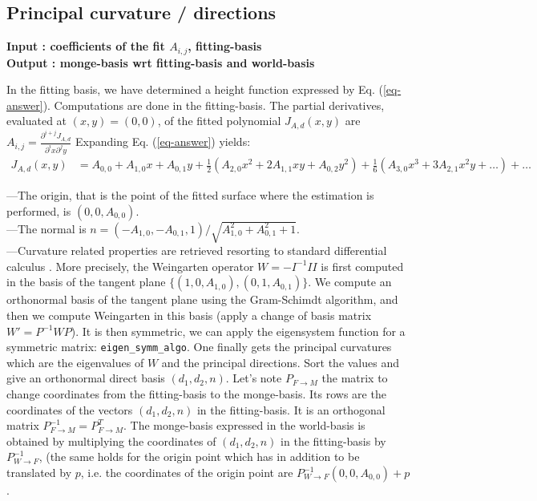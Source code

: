 \subsection{Principal  curvature / directions}

{\bf Input : coefficients of the fit $A_{i,j}$, 
fitting-basis \\
Output : monge-basis wrt fitting-basis and world-basis
}

In the fitting basis, we have determined a height function expressed
by Eq. (\ref{eq-answer}). Computations are done in the fitting-basis.
The partial derivatives, evaluated at $(x,y)=(0,0)$, of the fitted
polynomial $J_{A,d}(x,y)$ are
$A_{i,j}=\frac{\partial^{i+j}J_{A,d}}{\partial^ix \partial^jy}$
Expanding Eq. (\ref{eq-answer}) yields:
\begin{eqnarray}
J_{A,d}(x,y)&=
A_{0,0}+A_{1,0}x+A_{0,1}y+\frac{1}{2}(A_{2,0}x^2+2A_{1,1}xy+A_{0,2}y^2) 
+ \frac{1}{6}(A_{3,0}x^3+3A_{2,1}x^2y+\ldots )+ \ldots 
\end{eqnarray}


---The origin, that is the point of the fitted surface where the
estimation is performed, is $(0,0,A_{0,0})$. \\
---The normal is
$n=(-A_{1,0},-A_{0,1},1)/\sqrt{A_{1,0}^2+A_{0,1}^2+1}$.\\
---Curvature related properties are retrieved resorting to standard
differential calculus \cite{c-dgcs-76}. More precisely, the Weingarten
operator $W=-I^{-1}II$ is first computed in the basis of the tangent
plane $\{ (1,0,A_{1,0}), (0,1,A_{0,1}) \}$. We compute an orthonormal
basis of the tangent plane using the Gram-Schimdt algorithm, and then
we compute Weingarten in this basis (apply a change of basis matrix
$W'=P^{-1}WP$). It is then symmetric, we can apply the eigensystem
function for a symmetric matrix:
\verb+eigen_symm_algo+.
One finally gets the principal curvatures which are the eigenvalues of
$W$ and the principal directions. Sort the values and give an
orthonormal direct basis $(d_1,d_2,n)$. Let's note $P_{F
\rightarrow M}$ the matrix to change coordinates from the
fitting-basis to the monge-basis. Its rows are the coordinates of the
vectors $(d_1,d_2,n)$ in the fitting-basis. It is an orthogonal matrix
$P_{F \rightarrow M}^{-1}=P_{F \rightarrow M}^T$. The monge-basis
expressed in the world-basis is obtained by multiplying the coordinates
of $(d_1,d_2,n)$ in the fitting-basis by $P_{W\rightarrow F}^{-1}$,
(the same holds for the origin point which has in addition to be
translated by $p$, i.e. the coordinates of the origin point are
$P_{W\rightarrow F}^{-1} (0,0,A_{0,0}) +p$.

